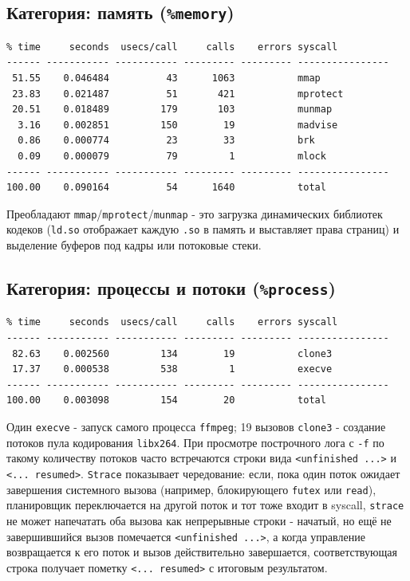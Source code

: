 \documentclass[12pt,a4paper]{article}
\begin{document}
\subsection{Категория: память (\texttt{\%memory})}
\begin{lstlisting}
% time     seconds  usecs/call     calls    errors syscall
------ ----------- ----------- --------- --------- ----------------
 51.55    0.046484          43      1063           mmap
 23.83    0.021487          51       421           mprotect
 20.51    0.018489         179       103           munmap
  3.16    0.002851         150        19           madvise
  0.86    0.000774          23        33           brk
  0.09    0.000079          79         1           mlock
------ ----------- ----------- --------- --------- ----------------
100.00    0.090164          54      1640           total
\end{lstlisting}
Преобладают \texttt{mmap}/\texttt{mprotect}/\texttt{munmap} - это загрузка
динамических библиотек кодеков (\texttt{ld.so} отображает каждую \texttt{.so} в
память и выставляет права страниц) и выделение буферов под кадры или потоковые стеки.

\subsection{Категория: процессы и потоки (\texttt{\%process})}
\begin{lstlisting}
% time     seconds  usecs/call     calls    errors syscall
------ ----------- ----------- --------- --------- ----------------
 82.63    0.002560         134        19           clone3
 17.37    0.000538         538         1           execve
------ ----------- ----------- --------- --------- ----------------
100.00    0.003098         154        20           total
\end{lstlisting}
Один \texttt{execve} - запуск самого процесса \texttt{ffmpeg}; 19 вызовов
\texttt{clone3} - создание потоков пула кодирования \texttt{libx264}.
При просмотре построчного лога с \texttt{-f} по такому
количеству потоков часто встречаются строки вида \texttt{<unfinished ...>} и
\texttt{<... resumed>}. \texttt{Strace} показывает чередование: если, пока один поток ожидает завершения системного вызова
(например, блокирующего \texttt{futex} или \texttt{read}), планировщик
переключается на другой поток и тот тоже входит в syscall, \texttt{strace}
не может напечатать оба вызова как непрерывные строки - начатый, но ещё не
завершившийся вызов помечается \texttt{<unfinished ...>}, а когда управление
возвращается к его поток и вызов действительно завершается, соответствующая
строка получает пометку \texttt{<... resumed>} с итоговым результатом.
 
\end{document}
